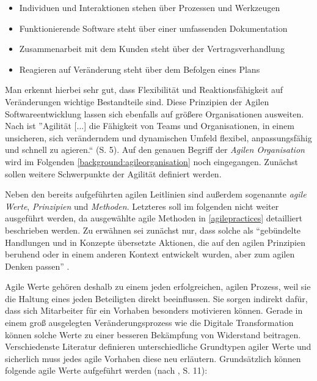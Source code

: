 \begin{itemize}[noitemsep, topsep=0pt]
	\item Individuen und Interaktionen stehen über Prozessen und Werkzeugen
	\item Funktionierende Software steht über einer umfassenden Dokumentation
	\item Zusammenarbeit mit dem Kunden steht über der Vertragsverhandlung
	\item Reagieren auf Veränderung steht über dem Befolgen eines Plans
\end{itemize}

Man erkennt hierbei sehr gut, dass Flexibilität und Reaktionsfähigkeit auf Veränderungen wichtige Bestandteile sind. Diese Prinzipien der Agilen Softwareentwicklung lassen sich ebenfalls auf größere Organisationen ausweiten. Nach  ist ''Agilität [...] die Fähigkeit von Teams und Organisationen, in einem unsicheren, sich veränderndem und dynamischen Umfeld flexibel, anpassungsfähig und schnell zu agieren.`` (S. 5). Auf den genauen Begriff der \textit{Agilen Organisation} wird im  Folgenden \ref{background:agileorganisation} noch eingegangen. Zunächst sollen weitere Schwerpunkte der Agilität definiert werden.

Neben den bereits aufgeführten agilen Leitlinien sind außerdem sogenannte \textit{agile Werte}, \textit{Prinzipien} und \textit{Methoden}. Letzteres soll im folgenden nicht weiter ausgeführt werden, da ausgewählte agile Methoden in \ref{agilepractices} detailliert beschrieben werden. Zu erwähnen sei zunächst nur, dass solche als ``gebündelte Handlungen und in Konzepte übersetzte Aktionen, die auf den agilen Prinzipien beruhend oder in einem anderen Kontext entwickelt wurden, aber zum agilen Denken passen'' \cite[S. 17]{hofert_agiler_2016}.

Agile Werte gehören deshalb zu einem jeden erfolgreichen, agilen Prozess, weil sie die Haltung eines jeden Beteiligten direkt beeinflussen. Sie sorgen indirekt dafür, dass sich Mitarbeiter für ein Vorhaben besonders motivieren können. \cite[S. 10]{hofert_agiler_2016} Gerade in einem groß ausgelegten Veränderungsprozess wie die Digitale Transformation können solche Werte zu einer besseren Bekämpfung von Widerstand beitragen. Verschiedenste Literatur definieren  unterschiedliche Grundtypen agiler Werte und sicherlich muss jedes agile Vorhaben diese neu erläutern. Grundsätzlich können folgende agile Werte aufgeführt werden  (nach , S. 11):

